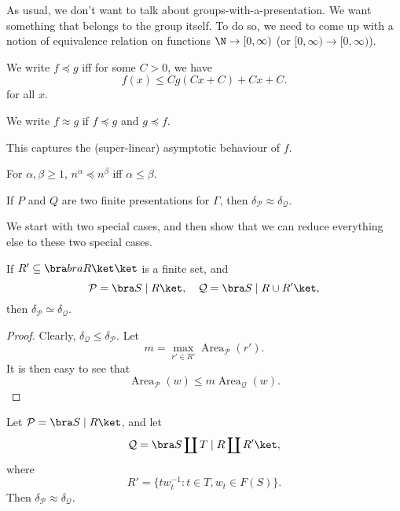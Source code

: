 \documentclass[a4paper]{article}
\DeclareMathOperator\Area{Area}
\begin{document}
As usual, we don't want to talk about groups-with-a-presentation. We want something that belongs to the group itself. To do so, we need to come up with a notion of equivalence relation on functions $\N \to [0, \infty)$ (or $[0, \infty) \to [0, \infty)$).

\begin{defi}[$\preccurlyeq$]\index{$\preccurlyeq$}
  We write $f \preccurlyeq g$ iff for some $C > 0$, we have
  \[
    f(x) \leq C g(Cx + C) + Cx + C.
  \]
  for all $x$.

  We write $f \approx g$ if $f \preccurlyeq g$ and $g \preccurlyeq f$.
\end{defi}
This captures the (super-linear) asymptotic behaviour of $f$.

\begin{eg}
  For $\alpha, \beta \geq 1$, $n^\alpha \preccurlyeq n^\beta$ iff $\alpha \leq \beta$.
\end{eg}

\begin{prop}
  If $P$ and $Q$ are two finite presentations for $\Gamma$, then $\delta_{\mathcal{P}} \approx \delta_{\mathcal{Q}}$.
\end{prop}

We start with two special cases, and then show that we can reduce everything else to these two special cases.
\begin{lemma}
  If $R' \subseteq \bra bra R \ket \ket$ is a finite set, and
  \[
    \mathcal{P} = \bra S \mid R \ket,\quad \mathcal{Q} = \bra S \mid R \cup R'\ket,
  \]
  then $\delta_{\mathcal{P}} \simeq \delta_{\mathcal{Q}}$.
\end{lemma}

\begin{proof}
  Clearly, $\delta_{\mathcal{Q}} \leq \delta_{\mathcal{P}}$. Let
  \[
    m= \max_{r' \in R'} \Area_{\mathcal{P}}(r').
  \]
  It is then easy to see that
  \[
    \Area_{\mathcal{P}}(w) \leq m \Area_{\mathcal{Q}}(w).
  \]
\end{proof}

\begin{lemma}
  Let $\mathcal{P} = \bra S \mid R\ket$, and let
  \[
    \mathcal{Q} = \bra S \coprod T \mid R \coprod R'\ket,
  \]
  where
  \[
    R' = \{t w_t^{-1}: t \in T, w_t \in F(S)\}.
  \]
  Then $\delta_{\mathcal{P}} \approx \delta_{\mathcal{Q}}$.
\end{lemma}
\end{document}
